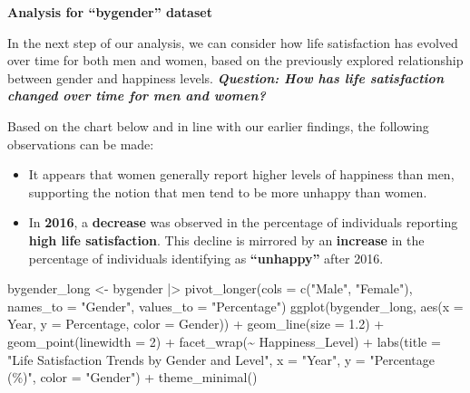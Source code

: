 \documentclass[
  11pt,
  a4paper,
  DIV=11,
  numbers=noendperiod]{scrartcl}
\newenvironment{Shaded}{\begin{snugshade}}{\end{snugshade}}
\newcommand{\AttributeTok}[1]{\textcolor[rgb]{0.40,0.45,0.13}{#1}}
\newcommand{\DecValTok}[1]{\textcolor[rgb]{0.68,0.00,0.00}{#1}}
\newcommand{\FloatTok}[1]{\textcolor[rgb]{0.68,0.00,0.00}{#1}}
\newcommand{\FunctionTok}[1]{\textcolor[rgb]{0.28,0.35,0.67}{#1}}
\newcommand{\NormalTok}[1]{\textcolor[rgb]{0.00,0.23,0.31}{#1}}
\newcommand{\OtherTok}[1]{\textcolor[rgb]{0.00,0.23,0.31}{#1}}
\newcommand{\SpecialCharTok}[1]{\textcolor[rgb]{0.37,0.37,0.37}{#1}}
\newcommand{\StringTok}[1]{\textcolor[rgb]{0.13,0.47,0.30}{#1}}
\begin{document}
\textbf{Analysis for ``bygender'' dataset}

In the next step of our analysis, we can consider how life satisfaction
has evolved over time for both men and women, based on the previously
explored relationship between gender and happiness levels.
{\textbf{\emph{Question: How has life satisfaction changed over time for
men and women?}}}

Based on the chart below and in line with our earlier findings, the
following observations can be made:

\begin{itemize}
\item
  It appears that women generally report higher levels of happiness than
  men, supporting the notion that men tend to be more unhappy than
  women.
\item
  In {\textbf{2016}}, a {\textbf{decrease}} was observed in the
  percentage of individuals reporting {\textbf{high life satisfaction}}.
  This decline is mirrored by an {\textbf{increase}} in the percentage
  of individuals identifying as {\textbf{``unhappy''}} after 2016.
\end{itemize}

\begin{Shaded}
\begin{Highlighting}[]
\NormalTok{bygender\_long }\OtherTok{\textless{}{-}}\NormalTok{ bygender }\SpecialCharTok{|\textgreater{}} 
  \FunctionTok{pivot\_longer}\NormalTok{(}\AttributeTok{cols =} \FunctionTok{c}\NormalTok{(}\StringTok{"Male"}\NormalTok{, }\StringTok{"Female"}\NormalTok{), }
               \AttributeTok{names\_to =} \StringTok{"Gender"}\NormalTok{, }
               \AttributeTok{values\_to =} \StringTok{"Percentage"}\NormalTok{)}
\FunctionTok{ggplot}\NormalTok{(bygender\_long, }\FunctionTok{aes}\NormalTok{(}\AttributeTok{x =}\NormalTok{ Year, }\AttributeTok{y =}\NormalTok{ Percentage, }\AttributeTok{color =}\NormalTok{ Gender)) }\SpecialCharTok{+}
  \FunctionTok{geom\_line}\NormalTok{(}\AttributeTok{size =} \FloatTok{1.2}\NormalTok{) }\SpecialCharTok{+}
  \FunctionTok{geom\_point}\NormalTok{(}\AttributeTok{linewidth =} \DecValTok{2}\NormalTok{) }\SpecialCharTok{+}
  \FunctionTok{facet\_wrap}\NormalTok{(}\SpecialCharTok{\textasciitilde{}}\NormalTok{ Happiness\_Level) }\SpecialCharTok{+}
  \FunctionTok{labs}\NormalTok{(}\AttributeTok{title =} \StringTok{"Life Satisfaction Trends by Gender and Level"}\NormalTok{,}
       \AttributeTok{x =} \StringTok{"Year"}\NormalTok{, }\AttributeTok{y =} \StringTok{"Percentage (\%)"}\NormalTok{,}
       \AttributeTok{color =} \StringTok{"Gender"}\NormalTok{) }\SpecialCharTok{+}
  \FunctionTok{theme\_minimal}\NormalTok{()}
\end{Highlighting}
\end{Shaded}
\end{document}
